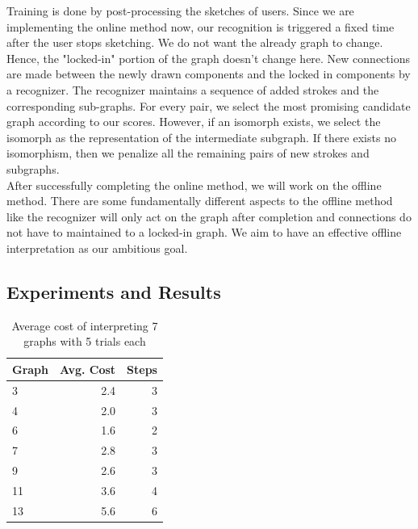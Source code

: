 Training is done by post-processing the sketches of users. Since we are implementing the online method now, our recognition is triggered a fixed time after the user stops sketching. We do not want the already graph to change. Hence, the "locked-in" portion of the graph doesn't change here. New connections are made between the newly drawn components and the locked in components by a recognizer. The recognizer maintains a sequence of added strokes and the corresponding sub-graphs. For every pair, we select the most promising candidate graph according to our scores. However, if an isomorph exists, we select the isomorph as the representation of the intermediate subgraph. If there exists no isomorphism, then we penalize all the remaining pairs of new strokes and subgraphs.\\

After successfully completing the online method, we will work on the offline method. There are some fundamentally different aspects to the offline method like the recognizer will only act on the graph after completion and connections do not have to maintained to a locked-in graph. We aim to have an effective offline interpretation as our ambitious goal.\\

\subsection{Experiments and Results}

\begin{table}[!htb] %
    \centering
    \begin{tabular}{lrr}
    \toprule
       Graph & Avg. Cost & Steps \\ %
         \midrule
3  & 2.4 & 3  \\ 
4 & 2.0 & 3 \\
6 & 1.6 & 2 \\
7 & 2.8 & 3 \\
9 & 2.6 & 3 \\
11 & 3.6 & 4 \\
13 & 5.6 & 6 \\
         \bottomrule
    \end{tabular}
    \caption{Average cost of interpreting 7 graphs with 5 trials each}
    \label{tab:table_cost}
\end{table}

